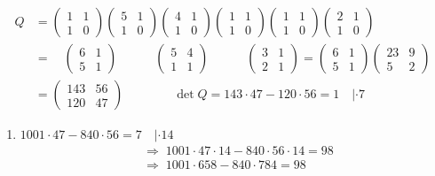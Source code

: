 \begin{loesung}
\begin{align*}
Q &= \begin{pmatrix}1&1\\1&0\end{pmatrix}\begin{pmatrix}5&1\\1&0\end{pmatrix}\begin{pmatrix}4&1\\1&0\end{pmatrix}\begin{pmatrix}1&1\\1&0\end{pmatrix}\begin{pmatrix}1&1\\1&0\end{pmatrix}\begin{pmatrix}2&1\\1&0\end{pmatrix}\\
&= \quad\begin{pmatrix}6&1\\5&1\end{pmatrix}\qquad\quad\begin{pmatrix}5&4\\1&1\end{pmatrix}\qquad\quad\begin{pmatrix}3&1\\2&1\end{pmatrix} = \begin{pmatrix}6&1\\5&1\end{pmatrix}\begin{pmatrix}23&9\\5&2\end{pmatrix}\\
&= \begin{pmatrix}143&56\\120&47\end{pmatrix} \qquad\qquad \det Q = 143\cdot 47 - 120\cdot 56 = 1 \quad |\cdot 7
\end{align*}
\begin{enumerate}
\item[(i)] $1001\cdot 47 - 840\cdot 56 = 7 \quad |\cdot 14$
\begin{align*}
&\Rightarrow\; 1001\cdot 47\cdot 14 - 840\cdot 56\cdot 14 = 98\\
&\Rightarrow\; 1001\cdot 658 - 840\cdot 784 = 98
\end{align*}

\end{enumerate}
\end{loesung}
